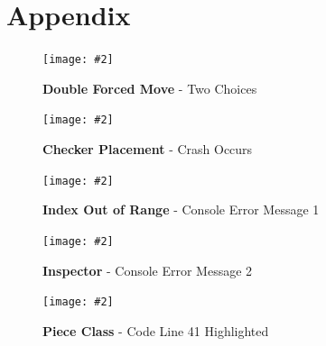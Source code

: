 \documentclass[10pt, a4paper]{article}
\newcommand{\figuremacro}[5]{
    \begin{figure}[#1]
        \centering
        \texttt{[image: \#2]}
        \caption[#3]{\textbf{#3}#4}
        \label{fig:#2}
    \end{figure}
}
\begin{document}
\section{Appendix}
\figuremacro{h}{Conflict}{Double Forced Move}{ - Two Choices}{1.0}
\figuremacro{h}{WhiteKingBug1}{Checker Placement}{ - Crash Occurs}{1.0}
\figuremacro{h}{WhiteKingBug2}{Index Out of Range}{ - Console Error Message 1}{2.0}
\figuremacro{h}{WhiteKingBug3}{Inspector}{ - Console Error Message 2}{1.5}
\figuremacro{h}{WhiteKingBug4}{Piece Class}{ - Code Line 41 Highlighted}{2.0}
		
\end{document}
